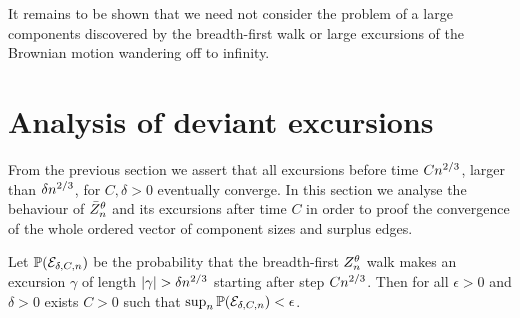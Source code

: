 
It remains to be shown that we need not consider the problem of a large components discovered by the breadth-first walk
or large excursions of the Brownian motion wandering off to infinity.

\section{Analysis of deviant excursions}
From the previous section we assert that all excursions before time $Cn^{2 / 3}$, larger than $\delta n^{2 / 3}$, for $C, \delta > 0$
eventually converge.
In this section we analyse the behaviour of $\bar{Z}^{\theta}_n$ and its excursions after time $C$ in order to proof the convergence
of the whole ordered vector of component sizes and surplus edges.

\begin{lemma} \label{L: late excursions}
	Let 
	$\mathbb{P}(\mathcal{E}_{\delta, C, n})$ 
	be the probability that the breadth-first $Z_n^{\theta}$ walk makes an excursion $\gamma$ of length 
	$|\gamma| > \delta n^{2 / 3}$ starting after step $Cn^{2 / 3}$.
	Then for all $\epsilon>0$ and $\delta > 0$ exists $C>0$ such that $\sup_n \mathbb{P}(\mathcal{E}_{\delta, C, n}) < \epsilon$. 
\end{lemma}

